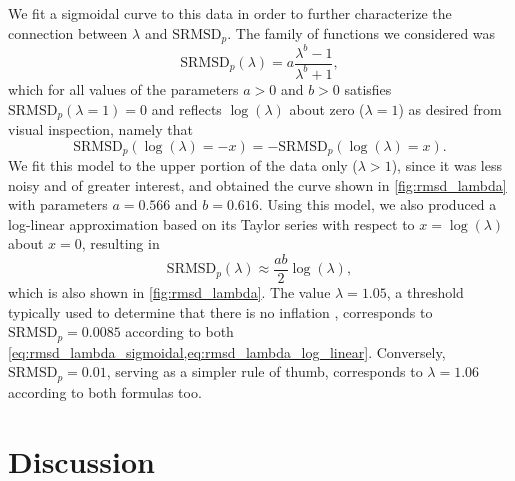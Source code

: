\documentclass[11pt]{article}
\newcommand{\rmsd}{\text{SRMSD}_p}
\begin{document}
We fit a sigmoidal curve to this data in order to further characterize the connection between $\lambda$ and $\rmsd$.
The family of functions we considered was
\begin{equation}
  \label{eq:rmsd_lambda_sigmoidal}
  \rmsd( \lambda ) = a \frac{ \lambda^b - 1 }{ \lambda^b + 1 },
\end{equation}
which for all values of the parameters $a > 0$ and $b > 0$ satisfies $\rmsd( \lambda = 1 ) = 0$ and reflects $\log( \lambda )$ about zero ($\lambda = 1$) as desired from visual inspection, namely that
$$
\rmsd( \log( \lambda ) = -x ) = - \rmsd( \log( \lambda ) = x ).
$$
We fit this model to the upper portion of the data only ($\lambda > 1$), since it was less noisy and of greater interest, and obtained the curve shown in \cref{fig:rmsd_lambda} with parameters $a = 0.566$ and $b = 0.616$.
Using this model, we also produced a log-linear approximation based on its Taylor series with respect to $x = \log( \lambda )$ about $x=0$, resulting in
\begin{equation}
  \label{eq:rmsd_lambda_log_linear}
  \rmsd( \lambda ) \approx \frac{a b}{2} \log( \lambda ),
\end{equation}
which is also shown in \cref{fig:rmsd_lambda}.
The value $\lambda = 1.05$, a threshold typically used to determine that there is no inflation \citep{price_new_2010}, corresponds to $\rmsd = 0.0085$ according to both \cref{eq:rmsd_lambda_sigmoidal,eq:rmsd_lambda_log_linear}.
Conversely, $\rmsd = 0.01$, serving as a simpler rule of thumb, corresponds to $\lambda = 1.06$ according to both formulas too.


\section{Discussion}



\end{document}
